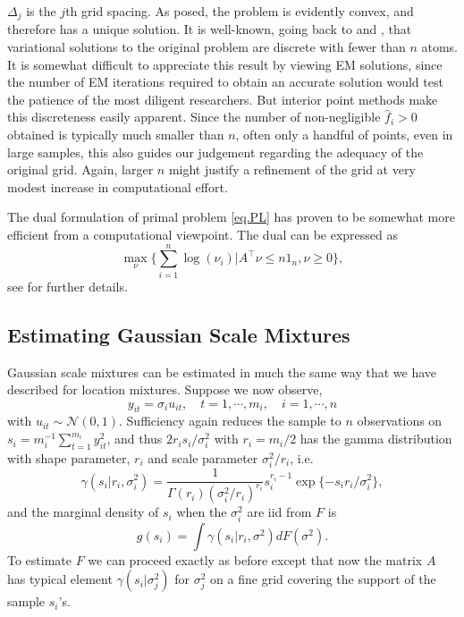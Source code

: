 \documentclass[12pt]{amsart}
\def\NN{\mathcal N}
\begin{document}
$\Delta_j$ is the $j$th grid spacing.  As posed, the problem is evidently
convex, and therefore has a unique solution.  It is well-known, going back to
 and , that variational solutions to the
original problem are discrete with fewer than $n$ atoms.  It is somewhat
difficult to appreciate this result by viewing EM solutions, since the number
of EM iterations required to obtain an accurate solution would test the patience
of the most diligent researchers.  But interior point methods make this discreteness
easily apparent.  Since the number of non-negligible $\hat f_i > 0$ obtained is
typically much smaller than $n$, often only a handful of points, even in 
large samples, this also guides our judgement regarding the adequacy of the original grid.
Again, larger $n$ might justify a refinement of the grid at very modest increase in
computational effort.

The dual formulation of primal problem \eqref{eq.PL} has proven to be somewhat more 
efficient from a computational viewpoint.  The dual can be expressed as
\begin{equation}
	\max_\nu \{ \sum_{i=1}^n \log (\nu_i) |  A^\top \nu \leq n 1_n, \nu \geq 0 \},
	\label{eq.DL}
\end{equation}
see  for further details.




\subsection{Estimating Gaussian Scale Mixtures}
Gaussian scale mixtures can be estimated in much the same way that we have
described for location mixtures.  Suppose we now observe,
\[
y_{it} = \sigma_i u_{it}, \quad t = 1, \cdots , m_i, \quad i= 1, \cdots , n
\]
with $u_{it} \sim \NN (0,1)$.  Sufficiency again reduces the sample to
$n$ observations on $s_i = m_i^{-1} \sum_{t=1}^{m_i} y_{it}^2$, and thus
$2 r_i s_i/\sigma_i^2$ with $r_i = m_i / 2$ has the gamma distribution with
shape parameter, $r_i$ and scale parameter $\sigma_i^2 / r_i$, i.e.
\[
\gamma (s_i | r_i,  \sigma_i^2 ) = \frac{1}{\Gamma (r_i) (\sigma_i^2/r_i)^{r_i}}
s_i^{r_i-1} \exp \{ - s_i r_i /\sigma_i^2 \},
\]
and the marginal density of $s_i$ when the $\sigma_i^2$ are iid from $F$ is
\[
g(s_i ) = \int \gamma (s_i | r_i, \sigma^2 ) dF(\sigma^2).
\]
To estimate $F$ we can proceed exactly as before except that now the matrix
$A$ has typical element $\gamma(s_i | \sigma_j^2)$ for $\sigma_j^2$ on
a fine grid covering the support of the sample $s_i$'s. 
\end{document}
